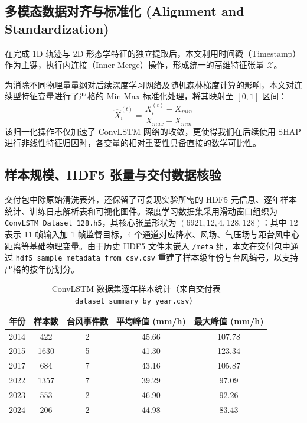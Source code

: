 \documentclass[12pt,a4paper]{ctexart}
\begin{document}
\subsection{多模态数据对齐与标准化 (Alignment and Standardization)}
在完成 1D 轨迹与 2D 形态学特征的独立提取后，本文利用时间戳（Timestamp）作为主键，执行内连接（Inner Merge）操作，形成统一的高维特征张量 $\mathcal{X}$。

为消除不同物理量量纲对后续深度学习网络及随机森林梯度计算的影响，本文对连续型特征变量进行了严格的 Min-Max 标准化处理，将其映射至 $[0, 1]$ 区间：
\begin{equation}
    \hat{X}_{i}^{(t)} = \frac{X_{i}^{(t)} - X_{min}}{X_{max} - X_{min}}
\end{equation}
该归一化操作不仅加速了 ConvLSTM 网络的收敛，更使得我们在后续使用 SHAP 进行非线性特征归因时，各变量的相对重要性具备直接的数学可比性。

\subsection{样本规模、HDF5 张量与交付数据核验}
交付包中除原始清洗表外，还保留了可复现实验所需的 HDF5 元信息、逐年样本统计、训练日志解析表和可视化图件。深度学习数据集采用滑动窗口组织为 \texttt{ConvLSTM\_Dataset\_128.h5}，其核心张量形状为 $(6921, 12, 4, 128, 128)$：其中 12 表示 11 帧输入加 1 帧监督目标，4 个通道对应降水、风场、气压场与距台风中心距离等基础物理变量。由于历史 HDF5 文件未嵌入 \texttt{/meta} 组，本文在交付包中通过 \texttt{hdf5\_sample\_metadata\_from\_csv.csv} 重建了样本级年份与台风编号，以支持严格的按年份划分。

\begin{table}[H]
    \centering
    \small
    \caption{ConvLSTM 数据集逐年样本统计（来自交付表 \texttt{dataset\_summary\_by\_year.csv}）}
    \label{tab:dataset_summary}
    \begin{tabular}{ccccc}
        \toprule
        \textbf{年份} & \textbf{样本数} & \textbf{台风事件数} & \textbf{平均峰值 (mm/h)} & \textbf{最大峰值 (mm/h)} \\
        \midrule
        2014 & 422 & 2 & 45.66 & 107.78 \\
        2015 & 1630 & 5 & 41.30 & 123.34 \\
        2017 & 684 & 7 & 43.16 & 105.87 \\
        2022 & 1357 & 7 & 39.29 & 97.09 \\
        2023 & 553 & 2 & 46.90 & 92.26 \\
        2024 & 206 & 2 & 44.98 & 83.43 \\
        \bottomrule
    \end{tabular}
\end{table}
\end{document}
